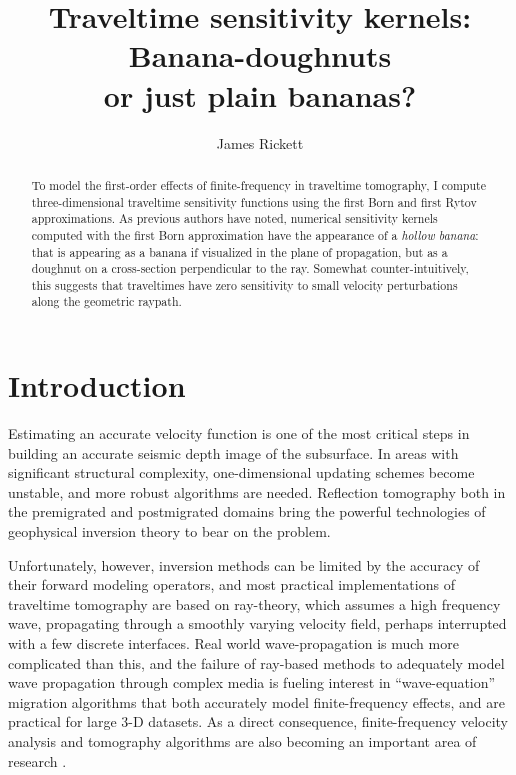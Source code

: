 \def\figdir{./Fig} 

\title{Traveltime sensitivity kernels: Banana-doughnuts \\ or just
plain bananas?}

\author{James Rickett}

\maketitle


\begin{abstract}
To model the first-order effects of finite-frequency in
traveltime tomography, I compute three-dimensional traveltime
sensitivity functions using the first Born and first Rytov
approximations. 
As previous authors have noted, numerical sensitivity kernels computed
with the first Born approximation have the appearance of a {\em hollow
banana}: that is appearing as a banana if visualized in the plane of
propagation, but as a doughnut on a cross-section perpendicular to the
ray.  Somewhat counter-intuitively, this suggests that traveltimes
have zero sensitivity to small velocity perturbations along the
geometric raypath.  
\end{abstract}

\section{Introduction}
Estimating an accurate velocity function is one of the most critical
steps in building an accurate seismic depth image of the subsurface.
In areas with significant structural complexity, one-dimensional
updating schemes become unstable, and more robust algorithms are
needed.
Reflection tomography both in the premigrated \cite[]{bishop85} and
postmigrated domains \cite[]{stork92,kosloff96} bring the powerful
technologies of geophysical inversion theory
to bear on the problem. 

\par
Unfortunately, however, inversion methods can be limited by the
accuracy of their forward modeling operators, and most practical 
implementations of traveltime tomography are based on ray-theory,
which assumes a high frequency wave, propagating through a smoothly
varying velocity field, perhaps interrupted with a few discrete
interfaces. 
Real world wave-propagation is much more complicated than this, and 
the failure of ray-based methods to adequately model wave propagation
through complex media is fueling interest in ``wave-equation''
migration algorithms that both accurately model finite-frequency
effects, and are practical for large 3-D datasets.
As a direct consequence, finite-frequency velocity analysis and
tomography algorithms are also becoming an important area of research 
\cite[]{woodward92,biondi.segab99}.

